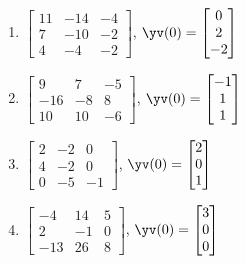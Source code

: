 \begin{exercise}
\begin{enumerate}
\item \(\begin{bmatrix} 11 & -14 & -4
\\7 & -10 & -2
\\4 & -4 & -2 \end{bmatrix}\), 
\(\yv(0)=\begin{bmatrix} 0
\\2
\\-2 \end{bmatrix}\)

\item \(\begin{bmatrix} 9 & 7 & -5
\\-16 & -8 & 8
\\10 & 10 & -6 \end{bmatrix}\), 
\(\yv(0)=\begin{bmatrix} -1
\\1
\\1 \end{bmatrix}\)

\item \(\begin{bmatrix} 2 & -2 & 0
\\4 & -2 & 0
\\0 & -5 & -1 \end{bmatrix}\), 
\(\yv(0)=\begin{bmatrix} 2
\\0
\\1 \end{bmatrix}\)

\item \(\begin{bmatrix} -4 & 14 & 5
\\2 & -1 & 0
\\-13 & 26 & 8 \end{bmatrix}\), 
\(\yv(0)=\begin{bmatrix} 3
\\0
\\0 \end{bmatrix}\)


\end{enumerate}
\end{exercise}






